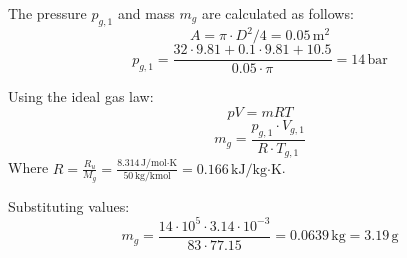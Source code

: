The pressure \( p_{g,1} \) and mass \( m_g \) are calculated as follows:  
\[ A = \pi \cdot D^2 / 4 = 0.05 \, \text{m}^2 \]  
\[ p_{g,1} = \frac{32 \cdot 9.81 + 0.1 \cdot 9.81 + 10.5}{0.05 \cdot \pi} = 14 \, \text{bar} \]  

Using the ideal gas law:  
\[ pV = mRT \]  
\[ m_g = \frac{p_{g,1} \cdot V_{g,1}}{R \cdot T_{g,1}} \]  
Where \( R = \frac{R_u}{M_g} = \frac{8.314 \, \text{J/mol·K}}{50 \, \text{kg/kmol}} = 0.166 \, \text{kJ/kg·K} \).  

Substituting values:  
\[ m_g = \frac{14 \cdot 10^5 \cdot 3.14 \cdot 10^{-3}}{83 \cdot 77.15} = 0.0639 \, \text{kg} = 3.19 \, \text{g} \]